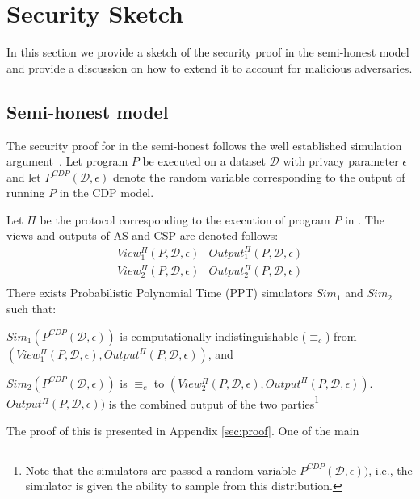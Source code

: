 

\section{\system Security Sketch}


In this section we provide a sketch of the security proof in the
semi-honest model and provide a discussion on how to extend it to account for malicious adversaries.
\subsection{Semi-honest model}
The security proof for \system in the semi-honest follows the well established
simulation argument~\cite[Chapter 7]{Oded}. %
Let program $P$ be executed on a dataset $\mathcal{D}$
with privacy parameter $\epsilon$ and let
$P^{CDP}(\mathcal{D},\epsilon)$ denote the random variable
corresponding to the output of running $P$ in the \textsf{CDP} model. \noindent
\begin{theorem}\label{thm:security}
\rm
Let $\Pi$ be the protocol corresponding to the execution of program $P$ in \system. The
views and outputs of \textsf{AS} and \textsf{CSP} are denoted follows:
\[
\begin{array}{cc}
View_1^{\Pi}(P,\mathcal{D},\epsilon) & Output_1^{\Pi}(P,\mathcal{D},\epsilon) \\
View_2^{\Pi}(P,\mathcal{D},\epsilon) & Output_2^{\Pi}(P,\mathcal{D},\epsilon) \\
\end{array}
\]
There exists Probabilistic Polynomial Time (PPT) simulators $Sim_1$
and $Sim_2$ such that:
\squishlist
\item $Sim_1 (P^{CDP}(\mathcal{D},\epsilon))$ is computationally indistinguishable ($\equiv_c$)
from $(View_1^{\Pi}(P,\mathcal{D},\epsilon),Output^{\Pi}(P,\mathcal{D},\epsilon))$, and
\item $Sim_2 (P^{CDP}(\mathcal{D},\epsilon))$ is $\equiv_c$ to
  $(View_2^{\Pi}(P,\mathcal{D},\epsilon),Output^{\Pi}(P,\mathcal{D},\epsilon))$.
  \squishend $Output^{\Pi}(P,\mathcal{D},\epsilon))$ is the combined
  output of the two parties\footnote{Note that the simulators are
    passed a random variable $P^{CDP}(\mathcal{D},\epsilon))$, i.e., the simulator is given the ability to sample
    from this distribution.}
\end{theorem}
The proof of this is presented in Appendix \ref{sec:proof}. One of the main
